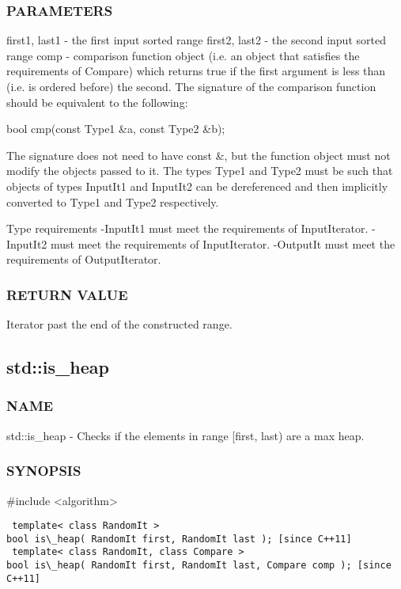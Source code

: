 \subsubsection{PARAMETERS}
first1, last1 - the first input sorted range
first2, last2 - the second input sorted range
comp - comparison function object (i.e. an object that satisfies the requirements of Compare) which returns true if the first argument is less than (i.e. is ordered before) the second.
The signature of the comparison function should be equivalent to the following:

 bool cmp(const Type1 \&a, const Type2 \&b);

The signature does not need to have const \&, but the function object must not modify the objects passed to it.
The types Type1 and Type2 must be such that objects of types InputIt1 and InputIt2 can be dereferenced and then implicitly converted to Type1 and Type2 respectively.

 Type requirements
 -InputIt1 must meet the requirements of InputIterator.
 -InputIt2 must meet the requirements of InputIterator.
 -OutputIt must meet the requirements of OutputIterator.

\subsubsection{RETURN VALUE}
Iterator past the end of the constructed range.



\subsection{std::is\_heap}

\subsubsection{NAME}
std::is\_heap - Checks if the elements in range [first, last) are a max heap.

\subsubsection{SYNOPSIS}
\#include <algorithm>

\begin{lstlisting}
 template< class RandomIt >
bool is\_heap( RandomIt first, RandomIt last ); [since C++11]
 template< class RandomIt, class Compare >
bool is\_heap( RandomIt first, RandomIt last, Compare comp ); [since C++11]
\end{lstlisting}


